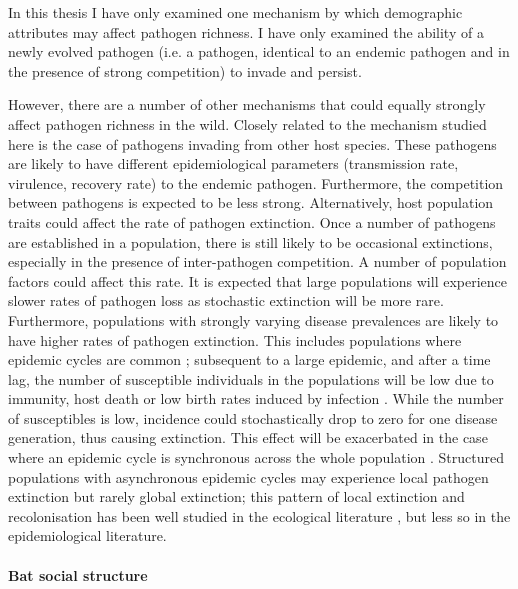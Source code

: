 In this thesis I have only examined one mechanism by which demographic attributes may affect pathogen richness.
I have only examined the ability of a newly evolved pathogen (i.e. a pathogen, identical to an endemic pathogen and in the presence of strong competition) to invade and persist.

However, there are a number of other mechanisms that could equally strongly affect pathogen richness in the wild.
Closely related to the mechanism studied here is the case of pathogens invading from other host species.
These pathogens are likely to have different epidemiological parameters (transmission rate, virulence, recovery rate) to the endemic pathogen.
Furthermore, the competition between pathogens is expected to be less strong.
Alternatively, host population traits could affect the rate of pathogen extinction.
Once a number of pathogens are established in a population, there is still likely to be occasional extinctions, especially in the presence of inter-pathogen competition.
A number of population factors could affect this rate.
It is expected that large populations will experience slower rates of pathogen loss as stochastic extinction will be more rare.
Furthermore, populations with strongly varying disease prevalences are likely to have higher rates of pathogen extinction.
This includes populations where epidemic cycles are common \cite{altizer2006sesonality}; subsequent to a large epidemic, and after a time lag, the number of susceptible individuals in the populations will be low due to immunity, host death or low birth rates induced by infection \cite{scott1987population, hethcote1994thousand}.
While the number of susceptibles is low, incidence could stochastically drop to zero for one disease generation, thus causing extinction. 
This effect will be exacerbated in the case where an epidemic cycle is synchronous across the whole population \cite{duke2011strong}.
Structured populations with asynchronous epidemic cycles may experience local pathogen extinction but rarely global extinction; this pattern of local extinction and recolonisation has been well studied in the ecological literature \cite{grenfell1995seasonality, levin1974dispersion, hanski1998metapopulation}, but less so in the epidemiological literature. %


\paragraph{Bat social structure}

